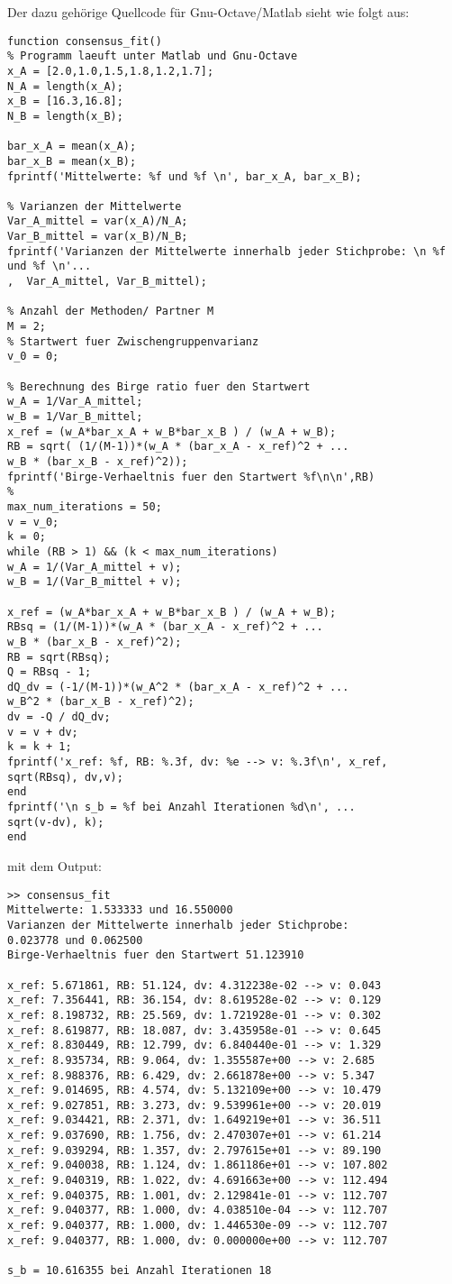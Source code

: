 Der dazu gehörige Quellcode für Gnu-Octave/Matlab sieht wie folgt aus:
\begin{lstlisting}[style=Matlab]
function consensus_fit()
% Programm laeuft unter Matlab und Gnu-Octave
x_A = [2.0,1.0,1.5,1.8,1.2,1.7];
N_A = length(x_A);
x_B = [16.3,16.8];
N_B = length(x_B);

bar_x_A = mean(x_A);
bar_x_B = mean(x_B);
fprintf('Mittelwerte: %f und %f \n', bar_x_A, bar_x_B);

% Varianzen der Mittelwerte
Var_A_mittel = var(x_A)/N_A;
Var_B_mittel = var(x_B)/N_B;
fprintf('Varianzen der Mittelwerte innerhalb jeder Stichprobe: \n %f und %f \n'...
,  Var_A_mittel, Var_B_mittel);

% Anzahl der Methoden/ Partner M
M = 2;
% Startwert fuer Zwischengruppenvarianz
v_0 = 0;

% Berechnung des Birge ratio fuer den Startwert
w_A = 1/Var_A_mittel;
w_B = 1/Var_B_mittel;
x_ref = (w_A*bar_x_A + w_B*bar_x_B ) / (w_A + w_B);
RB = sqrt( (1/(M-1))*(w_A * (bar_x_A - x_ref)^2 + ...
w_B * (bar_x_B - x_ref)^2));
fprintf('Birge-Verhaeltnis fuer den Startwert %f\n\n',RB)
%
max_num_iterations = 50;
v = v_0;
k = 0;
while (RB > 1) && (k < max_num_iterations)
w_A = 1/(Var_A_mittel + v);
w_B = 1/(Var_B_mittel + v);

x_ref = (w_A*bar_x_A + w_B*bar_x_B ) / (w_A + w_B);
RBsq = (1/(M-1))*(w_A * (bar_x_A - x_ref)^2 + ...
w_B * (bar_x_B - x_ref)^2);
RB = sqrt(RBsq);
Q = RBsq - 1;
dQ_dv = (-1/(M-1))*(w_A^2 * (bar_x_A - x_ref)^2 + ...
w_B^2 * (bar_x_B - x_ref)^2);
dv = -Q / dQ_dv;
v = v + dv;
k = k + 1;
fprintf('x_ref: %f, RB: %.3f, dv: %e --> v: %.3f\n', x_ref, sqrt(RBsq), dv,v);
end
fprintf('\n s_b = %f bei Anzahl Iterationen %d\n', ...
sqrt(v-dv), k);
end
\end{lstlisting}
mit dem Output:
\begin{lstlisting}[style=Matlab]
>> consensus_fit
Mittelwerte: 1.533333 und 16.550000
Varianzen der Mittelwerte innerhalb jeder Stichprobe:
0.023778 und 0.062500
Birge-Verhaeltnis fuer den Startwert 51.123910

x_ref: 5.671861, RB: 51.124, dv: 4.312238e-02 --> v: 0.043
x_ref: 7.356441, RB: 36.154, dv: 8.619528e-02 --> v: 0.129
x_ref: 8.198732, RB: 25.569, dv: 1.721928e-01 --> v: 0.302
x_ref: 8.619877, RB: 18.087, dv: 3.435958e-01 --> v: 0.645
x_ref: 8.830449, RB: 12.799, dv: 6.840440e-01 --> v: 1.329
x_ref: 8.935734, RB: 9.064, dv: 1.355587e+00 --> v: 2.685
x_ref: 8.988376, RB: 6.429, dv: 2.661878e+00 --> v: 5.347
x_ref: 9.014695, RB: 4.574, dv: 5.132109e+00 --> v: 10.479
x_ref: 9.027851, RB: 3.273, dv: 9.539961e+00 --> v: 20.019
x_ref: 9.034421, RB: 2.371, dv: 1.649219e+01 --> v: 36.511
x_ref: 9.037690, RB: 1.756, dv: 2.470307e+01 --> v: 61.214
x_ref: 9.039294, RB: 1.357, dv: 2.797615e+01 --> v: 89.190
x_ref: 9.040038, RB: 1.124, dv: 1.861186e+01 --> v: 107.802
x_ref: 9.040319, RB: 1.022, dv: 4.691663e+00 --> v: 112.494
x_ref: 9.040375, RB: 1.001, dv: 2.129841e-01 --> v: 112.707
x_ref: 9.040377, RB: 1.000, dv: 4.038510e-04 --> v: 112.707
x_ref: 9.040377, RB: 1.000, dv: 1.446530e-09 --> v: 112.707
x_ref: 9.040377, RB: 1.000, dv: 0.000000e+00 --> v: 112.707

s_b = 10.616355 bei Anzahl Iterationen 18
\end{lstlisting}
